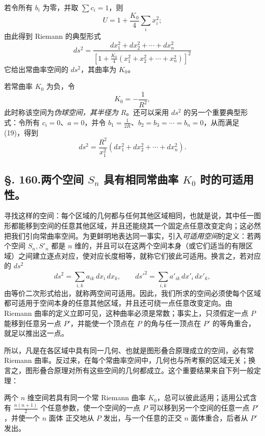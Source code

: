 若令所有 \(b_i\) 为零，并取 \(\sum c_i=1\)，则
\[
 U=1+\frac{K_0}{4}\sum_i x_i^2;
\]
由此得到 Riemann 的典型形式
\begin{equation}\tag{D}
 ds^2=\frac{dx_1^2+dx_2^2+
\cdots+dx_n^2}{\left[1+\frac{K_0}{4}(x_1^2+x_2^2+
\cdots+x_n^2)\right]^2}
\end{equation}
它给出常曲率空间的 \(ds^2\)，其曲率为 \(K_0\)。

若常曲率 \(K_0\) 为负，令
\[
 K_0=-\frac1{R^2},
\]
此时称该空间为\emph{伪球空间，其半径为} \(R\)。还可以采用 \(ds^2\) 的另一个重要典型形式：令所有 \(c_i=0\)、\(a=0\)，并令 \(b_1=\frac1{2R}\)、\(b_2=b_3=\cdots=b_n=0\)，从而满足 (19)，得到
\begin{equation}\tag{E}
 ds^2=\frac{R^2}{x_1^2}(dx_1^2+dx_2^2+
\cdots+dx_n^2).
\end{equation}

\subsection*{\S. 160.\quad 两个空间 \(S_n\) 具有相同常曲率 \(K_0\) 时的可适用性。}

寻找这样的空间：每个区域的几何都与任何其他区域相同，也就是说，其中任一图形都能移到空间的任意其他区域，并且还能绕其一个固定点任意改变定向；这必然把我们引向常曲率空间。为更鲜明地表达同一事实，引入\emph{可适用空间}的定义：若两个空间 \(S_n,S'_n\) 都是 \(n\) 维的，并且可以在这两个空间本身（或它们适当的有限区域）之间建立逐点对应，使对应长度相等，就称它们彼此可适用。换言之，若对应的 \(ds^2\)
\[
 ds^2=\sum_{i,k}a_{ik}\,dx_i\,dx_k,
\qquad
 ds'^2=\sum_{i,k}a'_{ik}\,dx'_i\,dx'_k,
\]
由等价二次形式给出，就称两空间可适用。因此，我们所求的空间必须使每个区域都可适用于空间本身的任意其他区域，并且还可绕一点任意改变定向。由 Riemann 曲率的定义立即可见，这种曲率必须是常数；事实上，只须假定一点 \(P\) 能移到任意另一点 \(P'\)，并能使一个顶点在 \(P\) 的角与任一顶点在 \(P'\) 的等角重合，就足以推出这一点。

所以，凡是在各区域中具有同一几何、也就是图形叠合原理成立的空间，必有常 Riemann 曲率。反过来，在每个常曲率空间中，几何也与所考察的区域无关；换言之，图形叠合原理对所有这些空间的几何都成立。这个重要结果来自下列一般定理：

\oldquote
两个 \(n\) 维空间若具有同一个常 Riemann 曲率 \(K_0\)，总可以彼此适用；适用公式含有 \(\frac{n(n+1)}2\) 个任意参数，使一个空间的一点 \(P\) 可以移到另一个空间的任意一点 \(P'\)，并使一个 \(n\) 面体 正交地从 \(P\) 发出，与一个任意的正交 \(n\) 面体重合，后者从 \(P'\) 发出。
\closeoldquote

